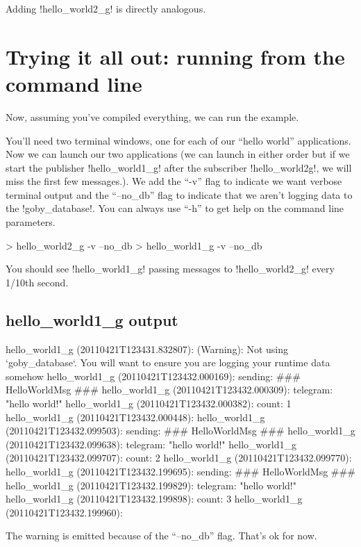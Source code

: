 Adding !hello_world2_g! is directly analogous.

\section{Trying it all out: running from the command line}

Now, assuming you've compiled everything, we can run the example.

You'll need two terminal windows, one for each of our ``hello world'' applications. Now we can launch our two applications (we can launch in either order but if we start the publisher !hello_world1_g! after the subscriber !hello_world2g!, we will miss the first few messages.). We add the ``-v'' flag to indicate we want verbose terminal output and the ``--no\_db'' flag to indicate that we aren't logging data to the !goby_database!. You can always use ``-h'' to get help on the command line parameters.

\begin{boxedverbatim}
> hello_world2_g -v --no_db
> hello_world1_g -v --no_db
\end{boxedverbatim}
\resetbvlinenumber

You should see !hello_world1_g! passing messages to !hello_world2_g! every 1/10th second.

\subsection{hello\_world1\_g output}
\begin{boxedverbatim}
hello_world1_g (20110421T123431.832807): (Warning): Not using
`goby_database`. You will want to ensure you are logging your 
runtime data somehow
hello_world1_g (20110421T123432.000169): sending: ### HelloWorldMsg ###
hello_world1_g (20110421T123432.000309): telegram: "hello world!"
hello_world1_g (20110421T123432.000382): count: 1
hello_world1_g (20110421T123432.000448): 
hello_world1_g (20110421T123432.099503): sending: ### HelloWorldMsg ###
hello_world1_g (20110421T123432.099638): telegram: "hello world!"
hello_world1_g (20110421T123432.099707): count: 2
hello_world1_g (20110421T123432.099770): 
hello_world1_g (20110421T123432.199695): sending: ### HelloWorldMsg ###
hello_world1_g (20110421T123432.199829): telegram: "hello world!"
hello_world1_g (20110421T123432.199898): count: 3
hello_world1_g (20110421T123432.199960): 
\end{boxedverbatim}
\resetbvlinenumber
The warning is emitted because of the ``--no\_db'' flag. That's ok for now.


